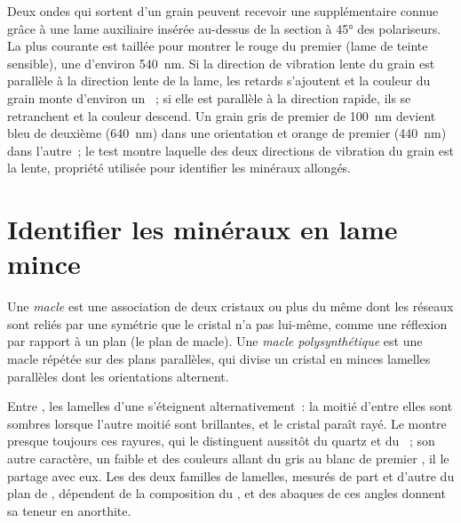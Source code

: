 Deux ondes qui sortent d'un grain peuvent recevoir une 
supplémentaire connue grâce à une lame auxiliaire insérée au-dessus de la section
à \ang{45} des polariseurs. La plus courante est taillée pour montrer le rouge du
premier  (lame de teinte sensible), une  d'environ
\qty{540}{nm}. Si la direction de vibration lente du grain est parallèle à la
direction lente de la lame, les retards s'ajoutent et la couleur du grain monte
d'environ un ~; si elle est parallèle à la direction rapide, ils se
retranchent et la couleur descend. Un grain gris de premier  de \qty{100}{nm}
devient bleu de deuxième  (\qty{640}{nm}) dans une orientation et orange de
premier  (\qty{440}{nm}) dans l'autre~; le test montre laquelle des deux
directions de vibration du grain est la lente, propriété utilisée pour identifier
les minéraux allongés.

\section{Identifier les minéraux en lame mince}

\begin{definition}\label{def:b1:optical-mineralogy:twin}
Une \emph{macle} est une association de deux cristaux ou plus du même
 dont les réseaux sont reliés par une symétrie que le cristal n'a pas
lui-même, comme une réflexion par rapport à un plan (le plan de macle). Une
\emph{macle polysynthétique} est une macle répétée sur des plans parallèles, qui
divise un cristal en minces lamelles parallèles dont les orientations alternent.
\end{definition}

Entre , les lamelles d'une  s'éteignent
alternativement~: la moitié d'entre elles sont sombres lorsque l'autre moitié sont
brillantes, et le cristal paraît rayé. Le  montre presque toujours ces
rayures, qui le distinguent aussitôt du quartz et du ~; son autre
caractère, un  faible et des couleurs allant du gris au blanc de premier
, il le partage avec eux. Les  des deux familles de
lamelles, mesurés de part et d'autre du plan de , dépendent de la
composition du , et des abaques de ces angles donnent sa teneur en
anorthite.


